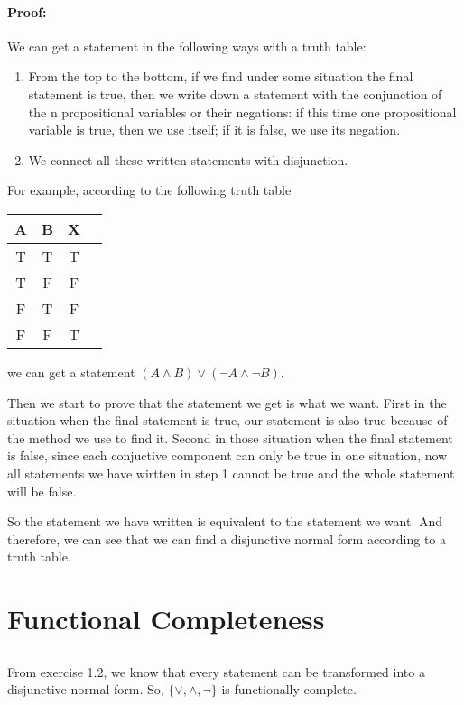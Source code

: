 \documentclass[a4paper,12pt,titlepage]{article}
\begin{document}
\paragraph{Proof:}
We can get a statement in the following ways with a truth table:
\begin{enumerate}
\item From the top to the bottom, if we find under some situation the final statement is true, then we write down a statement with the conjunction of the n propositional variables or their negations: if this time one propositional variable is true, then we use itself; if it is false, we use its negation. 
\item We connect all these written statements with disjunction. 
\end{enumerate}
For example, according to the following truth table
\begin{table}[H]
  \centering
\begin{tabular}{|c|c|c|c|}
\hline
\hline
A & B & X \\
\hline
T & T & T  \\
\hline
T & F & F  \\
\hline
F & T & F  \\
\hline
F & F & T \\
\hline
\hline
\end{tabular}
\end{table}
we can get a statement $(A\wedge B)\vee(\neg A\wedge\neg B)$. 

Then we start to prove that the statement we get is what we want. First in the situation when the final statement is true, our statement is also true because of the method we use to find it. Second in those situation when the final statement is false, since each conjuctive component can only be true in one situation, now all statements we have wirtten in step 1 cannot be true and the whole statement will be false. 

So the statement we have written is equivalent to the statement we want. And therefore, we can see that we can find a disjunctive normal form according to a truth table. 
\section{Functional Completeness}
\subsection{}
\paragraph{} From exercise 1.2, we know that every statement can be transformed into a disjunctive normal form. So, $\lbrace\vee,\wedge,\neg\rbrace$ is functionally complete.
\end{document}

